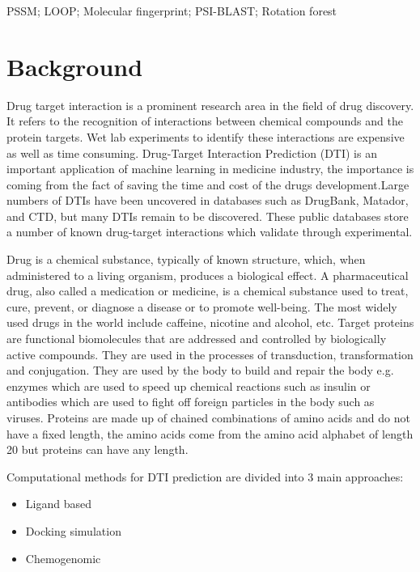 \documentclass[conference]{IEEEtran}
\begin{document}
\begin{IEEEkeywords}
PSSM; LOOP; Molecular fingerprint; PSI-BLAST; Rotation forest
\end{IEEEkeywords}

\section{Background}
Drug target interaction is a prominent research area in the field of drug discovery. It refers to the recognition of interactions between chemical compounds and the protein targets. Wet lab experiments to identify these interactions are expensive as well as time consuming. Drug-Target Interaction Prediction (DTI) is an important application of machine learning in medicine industry, the importance is coming from the fact of saving the time and cost of the drugs development.Large numbers of DTIs have been uncovered in databases such as DrugBank, Matador, and CTD, but many DTIs remain to be discovered. These public databases store a number of known drug-target interactions which validate through experimental.

Drug is a chemical substance, typically of known structure, which, when administered to a living organism, produces a biological effect. A pharmaceutical drug, also called a medication or medicine, is a chemical substance used to treat, cure, prevent, or diagnose a disease or to promote well-being. The most widely used drugs in the world include caffeine, nicotine and alcohol, etc. Target proteins are functional biomolecules that are addressed and controlled by biologically active compounds. They are used in the processes of transduction, transformation and conjugation. They are used by the body to build and repair the body e.g. enzymes which are used to speed up chemical reactions such as insulin or antibodies which are used to fight off foreign particles in the body such as viruses. Proteins are made up of chained combinations of amino acids and do not have a fixed length, the amino acids come from the amino acid alphabet of length 20 but proteins can have any length. 

Computational methods for DTI prediction are divided into 3 main approaches:
\begin{itemize}
\item Ligand based
\item Docking simulation
\item Chemogenomic
\end{itemize}
\end{document}
